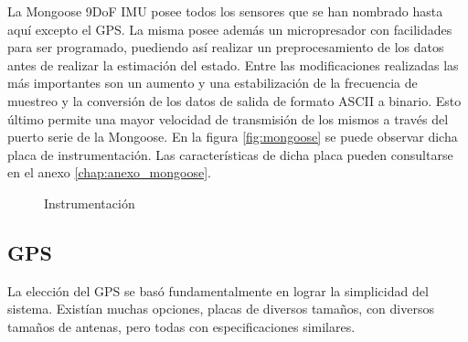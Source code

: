 \documentclass[main]{subfiles}
\begin{document}
La Mongoose 9DoF IMU posee todos los sensores que se han nombrado hasta aqu\'i excepto el GPS. La misma posee adem\'as un micropresador con facilidades para ser programado, puediendo as\'i realizar un preprocesamiento de los datos antes de realizar la estimaci\'on del estado. Entre las modificaciones realizadas las m\'as importantes son un aumento y una estabilizaci\'on de la frecuencia de muestreo y la conversi\'on de los datos de salida de formato ASCII a binario. Esto \'ultimo permite una mayor velocidad de transmisi\'on de los mismos a trav\'es del puerto serie de la Mongoose. En la figura \ref{fig:mongoose} se puede observar dicha placa de instrumentaci\'on. Las caracter\'isticas de dicha placa pueden consultarse en el anexo  \ref{chap:anexo_mongoose}.

\begin{figure} 
  \vspace{-40pt}
  \centering
  \hspace{2cm}
  
  \caption{Instrumentaci\'on}
  \label{fig:intrumentacion}
\end{figure}

\subsection{GPS}

La elecci\'on del GPS se bas\'o fundamentalmente en lograr la simplicidad del sistema. Exist\'ian muchas opciones, placas de diversos tama\~nos, con diversos tama\~nos de antenas, pero todas con especificaciones similares.\\
\end{document}
